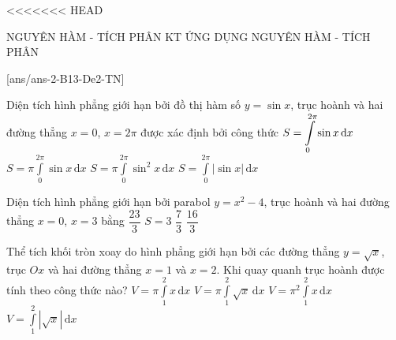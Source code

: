 <<<<<<< HEAD
\begin{name}
	{NGUYÊN HÀM - TÍCH PHÂN}
	{KT ỨNG DỤNG NGUYÊN HÀM - TÍCH PHÂN}
	{\tentruong}
	{\thoigian}
\end{name}
\setcounter{ex}{0}\setcounter{bt}{0}
[ans/ans-2-B13-De2-TN]
\TN
\begin{ex}%
Diện tích hình phẳng giới hạn bởi đồ thị hàm số $y=\sin x$, trục hoành và hai đường thẳng $x=0$, $x=2\pi$ được xác định bởi công thức
	\choice
	{$S=\displaystyle\displaystyle\int\limits_0^{2\pi}\sin x\mathrm{\,d}x$}
	{$S=\pi\displaystyle\int\limits_0^{2\pi}\sin x\mathrm{\,d}x$}
	{$S=\pi\displaystyle\int\limits_0^{2\pi}\sin^2 x\mathrm{\,d}x$}
	{\True $S=\displaystyle\int\limits_0^{2\pi}\left| \sin x \right|\mathrm{\,d}x$}
\end{ex}
\begin{ex}%
Diện tích hình phẳng giới hạn bởi parabol $y=x^2-4$, trục hoành và hai đường thẳng $x=0$, $x=3$ bằng
	\choice
	{\True $\dfrac{23}{3}$}
	{$S=3$}
	{$\dfrac{7}{3}$}
	{$\dfrac{16}{3}$}
\end{ex}
\begin{ex}%
Thể tích khối tròn xoay do hình phẳng giới hạn bởi các đường thẳng $y=\sqrt{x}$, trục $Ox$ và hai đường thẳng $x=1$ và $x=2$. Khi quay quanh trục hoành được tính theo công thức nào?
	\choice
	{\True $V=\pi\displaystyle\int\limits_1^2 x\mathrm{\,d}x$}
	{$V=\pi \displaystyle\int\limits_1^2 \sqrt{x}\mathrm{\,d}x$}
	{$V=\pi^2\displaystyle\int\limits_1^2 x\mathrm{\,d}x$}
	{$V=\displaystyle\int\limits_1^2 \left|\sqrt{x}\right|\mathrm{\,d}x$}
\end{ex}
